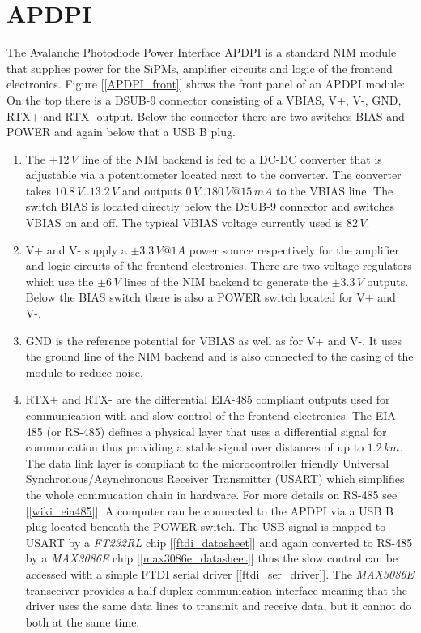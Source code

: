 \documentclass[a4paper, 12pt]{article}
\begin{document}
	\section{APDPI}

The Avalanche Photodiode Power Interface APDPI is a standard NIM module that supplies power for the SiPMs, amplifier circuits and logic of the frontend electronics.
Figure [\ref{APDPI_front}] shows the front panel of an APDPI module: On the top there is a DSUB-9 connector consisting of a VBIAS, V+, V-, GND, RTX+ and RTX- output.
Below the connector there are two switches BIAS and POWER and again below that a USB B plug.

		\begin{enumerate}

			\item The $+12\,V$ line of the NIM backend is fed to a DC-DC converter that is adjustable via a potentiometer located next to the converter.
			The converter takes $10.8\,V .. 13.2\,V$ and outputs $0\,V .. 180\,V@15\,mA$ to the VBIAS line. The switch BIAS is located directly below the DSUB-9 connector
			and switches VBIAS on and off. The typical VBIAS voltage currently used is $82\,V$.

			\item V+ and V- supply a $\pm3.3\,V@1A$ power source respectively for the amplifier and logic circuits of the frontend electronics. There are two voltage regulators 
			which use the $\pm6\,V$ lines of the NIM backend to generate the $\pm3.3\,V$ outputs. Below the BIAS switch there is also a POWER switch located for V+ and V-.

			\item GND is the reference potential for VBIAS as well as for V+ and V-. It uses the ground line of the NIM backend and is also connected to the casing of the module to reduce noise.

			\item RTX+ and RTX- are the differential EIA-485 compliant outputs used for communication with and slow control of the frontend electronics. The EIA-485 (or RS-485) defines a 
			physical layer that uses a differential signal for communcation thus providing a stable signal over distances of up to $1.2\,km$. The data link layer is 
			compliant to the microcontroller friendly Universal Synchronous/Asynchronous Receiver Transmitter (USART) which simplifies the whole commucation chain in hardware. 
			For more details on RS-485 see [\ref{wiki_eia485}].
			A computer can be connected to the APDPI via a USB B plug located beneath the POWER switch. The USB signal is mapped to USART by a \emph{FT232RL} chip [\ref{ftdi_datasheet}] 
			and again converted to RS-485 by a \emph{MAX3086E} chip [\ref{max3086e_datasheet}] thus the slow control can be accessed with a simple FTDI serial driver [\ref{ftdi_ser_driver}].
			The \emph{MAX3086E} transceiver provides a half duplex communication interface meaning that the driver uses the same data lines to transmit and receive data, but it cannot
			do both at the same time.
		
		\end{enumerate}
\end{document}
